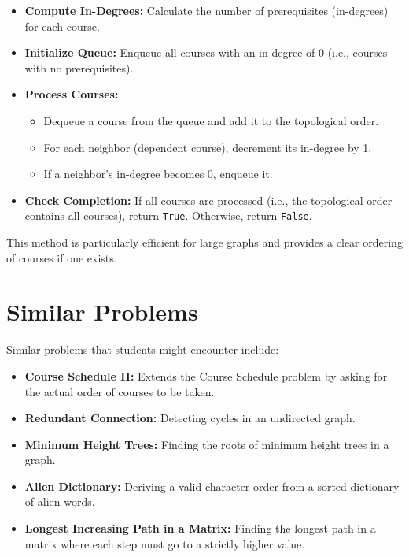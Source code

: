 \begin{itemize}
    \item \textbf{Compute In-Degrees:} Calculate the number of prerequisites (in-degrees) for each course.
    \item \textbf{Initialize Queue:} Enqueue all courses with an in-degree of 0 (i.e., courses with no prerequisites).
    \item \textbf{Process Courses:}
    \begin{itemize}
        \item Dequeue a course from the queue and add it to the topological order.
        \item For each neighbor (dependent course), decrement its in-degree by 1.
        \item If a neighbor's in-degree becomes 0, enqueue it.
    \end{itemize}
    \item \textbf{Check Completion:} If all courses are processed (i.e., the topological order contains all courses), return \texttt{True}. Otherwise, return \texttt{False}.
\end{itemize}

This method is particularly efficient for large graphs and provides a clear ordering of courses if one exists.

\section*{Similar Problems}

Similar problems that students might encounter include:
    
\begin{itemize}
    \item \textbf{Course Schedule II:} Extends the Course Schedule problem by asking for the actual order of courses to be taken.
    
    \item \textbf{Redundant Connection:} Detecting cycles in an undirected graph.
    
    \item \textbf{Minimum Height Trees:} Finding the roots of minimum height trees in a graph.
    
    \item \textbf{Alien Dictionary:} Deriving a valid character order from a sorted dictionary of alien words.
    
    \item \textbf{Longest Increasing Path in a Matrix:} Finding the longest path in a matrix where each step must go to a strictly higher value.
\end{itemize}


